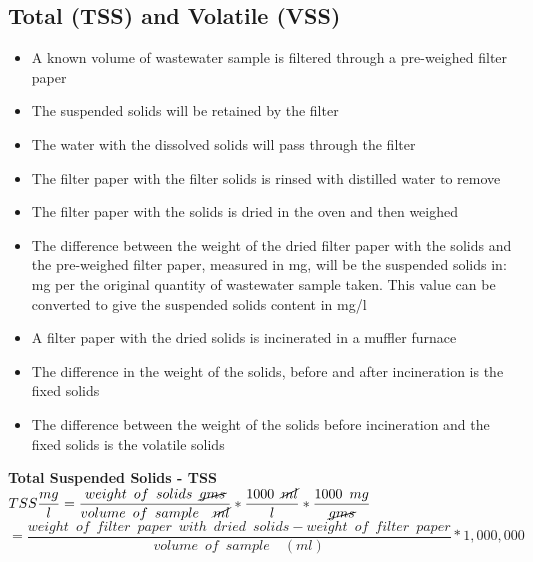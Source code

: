 	\subsection{Total (TSS) and Volatile (VSS)}
\begin{itemize}
\setlength\itemsep{1em}
					\item A known volume of wastewater sample is filtered through a pre-weighed filter paper
					\item The suspended solids will be retained by the filter
					\item The water with the dissolved solids will pass through the filter
					\item The filter paper with the filter solids is rinsed with distilled water to remove 
					\item The filter paper with the solids is dried in the oven and then weighed
					\item The difference between the weight of the dried filter paper with the solids and the pre-weighed filter paper, measured in mg, will be the suspended solids in: mg per the original quantity of wastewater sample taken.  This value can be converted to give the suspended solids content in mg/l
					\item A filter paper with the dried solids is incinerated in a muffler furnace
					\item The difference in the weight of the solids, before and after incineration is the fixed solids
					\item The difference between the weight of the solids before incineration and the fixed solids is the volatile solids
	\end{itemize}				

\textbf{Total Suspended Solids - TSS}
\vspace{0.4cm}
$TSS \dfrac{mg}{l}=\dfrac{weight \enspace of \enspace solids \enspace \cancel{gms}}{volume \enspace of \enspace sample \enspace \enspace \cancel{ml}}*\dfrac{1000 \enspace \cancel{ml}}{l}*\dfrac{1000 \enspace mg}{\cancel{gms}}$\\
\vspace{0.3cm}
\hspace{1.4cm}$=\dfrac{weight \enspace of \enspace filter \enspace paper  \enspace with \enspace dried  \enspace solids - weight \enspace of \enspace filter \enspace paper}{volume \enspace of \enspace sample \enspace \enspace (ml)}*1,000,000$\\
\vspace{0.4cm}

